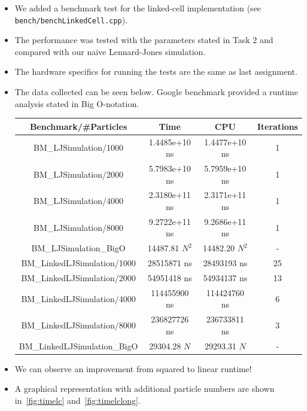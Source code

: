 \documentclass{article}
\begin{document}
\begin{itemize}
    \item We added a benchmark test for the linked-cell implementation \newline(see \texttt{bench/benchLinkedCell.cpp}).
    \item The performance was tested with the parameters stated in Task 2 and compared with our naive Lennard-Jones simulation.
    \item The hardware specifics for running the tests are the same as last assignment.
    \item The data collected can be seen below. Google benchmark provided a runtime analysis stated in Big O-notation.\newline
    \newline
    \begin{tabular}{|c|c|c|c|}
        \toprule
        Benchmark/\#Particles & Time & CPU & Iterations \\
        \toprule
        BM\_LJSimulation/1000 & 1.4485e+10 ns & 1.4477e+10 ns & 1 \\
        \midrule
        BM\_LJSimulation/2000 & 5.7983e+10 ns & 5.7959e+10 ns & 1 \\
        \midrule
        BM\_LJSimulation/4000 & 2.3180e+11 ns & 2.3171e+11 ns & 1 \\
        \midrule
        BM\_LJSimulation/8000 & 9.2722e+11 ns & 9.2686e+11 ns & 1 \\
        \midrule
        BM\_LJSimulation\_BigO & 14487.81 $N^2$ & 14482.20 $N^2$ & - \\
        \midrule
        BM\_LinkedLJSimulation/1000 & 28515871 ns & 28493193 ns & 25 \\
        \midrule
        BM\_LinkedLJSimulation/2000 & 54951418 ns & 54934137 ns & 13 \\
        \midrule
        BM\_LinkedLJSimulation/4000 & 114455900 ns & 114424760 ns & 6 \\
        \midrule
        BM\_LinkedLJSimulation/8000 & 236827726 ns & 236733811 ns & 3 \\
        \midrule
        BM\_LinkedLJSimulation\_BigO & 29304.28 $N$ & 29293.31 $N$ & - \\
        \bottomrule
    \end{tabular}
    \item We can observe an improvement from squared to linear runtime!
    \item A graphical representation with additional particle numbers are shown in\ \ref{fig:timelc} and\ \ref{fig:timelclong}.
\end{itemize}
\end{document}
